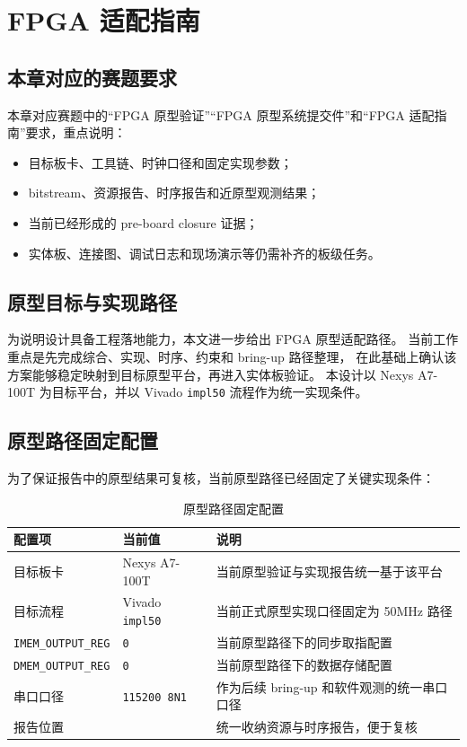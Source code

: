 \section{FPGA 适配指南}

\subsection{本章对应的赛题要求}

本章对应赛题中的“FPGA 原型验证”“FPGA 原型系统提交件”和“FPGA 适配指南”要求，重点说明：
\begin{itemize}
    \item 目标板卡、工具链、时钟口径和固定实现参数；
    \item bitstream、资源报告、时序报告和近原型观测结果；
    \item 当前已经形成的 pre-board closure 证据；
    \item 实体板、连接图、调试日志和现场演示等仍需补齐的板级任务。
\end{itemize}

\subsection{原型目标与实现路径}

为说明设计具备工程落地能力，本文进一步给出 FPGA 原型适配路径。
当前工作重点是先完成综合、实现、时序、约束和 bring-up 路径整理，
在此基础上确认该方案能够稳定映射到目标原型平台，再进入实体板验证。
本设计以 Nexys A7-100T 为目标平台，并以 Vivado \texttt{impl50} 流程作为统一实现条件。



\subsection{原型路径固定配置}

为了保证报告中的原型结果可复核，当前原型路径已经固定了关键实现条件：
\begin{table}[H]
    \centering
    \small
    \caption{原型路径固定配置}
    \begin{tabularx}{0.95\textwidth}{L{0.28\textwidth} L{0.20\textwidth} Y}
        \toprule
        配置项 & 当前值 & 说明 \\
        \midrule
        目标板卡 & Nexys A7-100T & 当前原型验证与实现报告统一基于该平台 \\
        目标流程 & Vivado \texttt{impl50} & 当前正式原型实现口径固定为 50MHz 路径 \\
        \texttt{IMEM\_OUTPUT\_REG} & \texttt{0} & 当前原型路径下的同步取指配置 \\
        \texttt{DMEM\_OUTPUT\_REG} & \texttt{0} & 当前原型路径下的数据存储配置 \\
        串口口径 & \texttt{115200 8N1} & 作为后续 bring-up 和软件观测的统一串口口径 \\
        报告位置 &  & 统一收纳资源与时序报告，便于复核 \\
        \bottomrule
    \end{tabularx}
\end{table}

